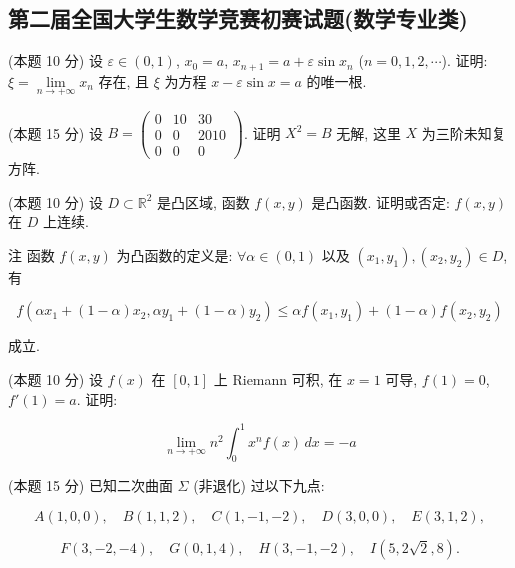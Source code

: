 \documentclass[loose]{ExBook}
\begin{document}
\subsection{第二届全国大学生数学竞赛初赛试题(数学专业类)}
\begin{qitems}
    \begin{bbox}
        \qitem (本题 10 分) 设 \(\varepsilon \in (0,1)\), \(x_0 = a\), \(x_{n+1} = a + \varepsilon \sin x_n\) (\(n = 0,1,2,\cdots\)). 证明: \(\xi = \lim\limits_{n \to +\infty} x_n\) 存在, 且 \(\xi\) 为方程 \(x - \varepsilon \sin x = a\) 的唯一根.
    \end{bbox}

    \begin{bbox}
        \qitem (本题 15 分) 设 \(B = \begin{pmatrix}
        0 & 10 & 30 \\
        0 & 0 & 2010 \\
        0 & 0 & 0
        \end{pmatrix}\). 证明 \(X^2 = B\) 无解, 这里 \(X\) 为三阶未知复方阵.
    \end{bbox}

    \begin{bbox}
        \qitem (本题 10 分) 设 \(D \subset \mathbb{R}^2\) 是凸区域, 函数 \(f(x,y)\) 是凸函数. 证明或否定: \(f(x,y)\) 在 \(D\) 上连续.

        注 函数 \(f(x,y)\) 为凸函数的定义是: \(\forall \alpha \in (0,1)\) 以及 \((x_1,y_1),(x_2,y_2) \in D\), 有
        
        \[ f(\alpha x_1 + (1-\alpha)x_2, \alpha y_1 + (1-\alpha)y_2) \leq \alpha f(x_1,y_1) + (1-\alpha)f(x_2,y_2) \]
        
        成立.
    \end{bbox}

    \begin{bbox}
        \qitem (本题 10 分) 设 \(f(x)\) 在 \([0,1]\) 上 Riemann 可积, 在 \(x = 1\) 可导, \(f(1) = 0\), \(f'(1) = a\). 证明:
        
        \[ \lim\limits_{n \to +\infty} n^2 \int_0^1 x^n f(x) \, dx = -a \]
    \end{bbox}

    \begin{bbox}
        \qitem (本题 15 分) 已知二次曲面 \(\Sigma\) (非退化) 过以下九点:
        
        \[ A(1,0,0), \quad B(1,1,2), \quad C(1,-1,-2), \quad D(3,0,0), \quad E(3,1,2), \]
        
        \[ F(3,-2,-4), \quad G(0,1,4), \quad H(3,-1,-2), \quad I(5,2\sqrt{2},8). \]
        

\end{bbox}
\end{qitems}
\end{document}
